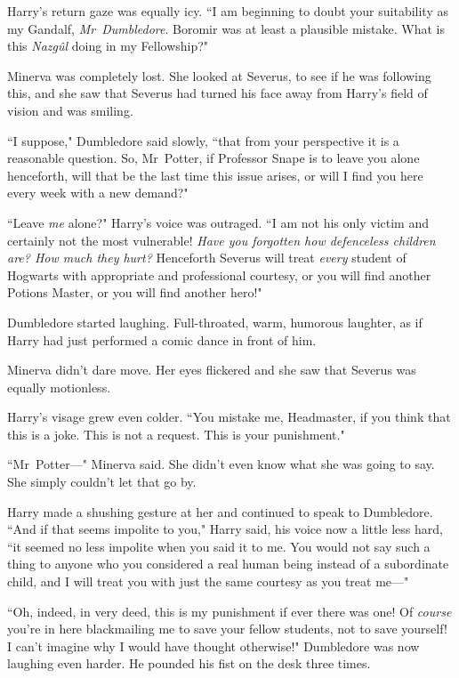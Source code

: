Harry's return gaze was equally icy. ``I am beginning to doubt your suitability as my Gandalf, \emph{Mr~Dumbledore}. Boromir was at least a plausible mistake. What is this \emph{Nazgûl} doing in my Fellowship?"

Minerva was completely lost. She looked at Severus, to see if he was following this, and she saw that Severus had turned his face away from Harry's field of vision and was smiling.

``I suppose," Dumbledore said slowly, ``that from your perspective it is a reasonable question. So, Mr~Potter, if Professor Snape is to leave you alone henceforth, will that be the last time this issue arises, or will I find you here every week with a new demand?"

``Leave \emph{me} alone?" Harry's voice was outraged. ``I am not his only victim and certainly not the most vulnerable! \emph{Have you forgotten how defenceless children are? How much they hurt?} Henceforth Severus will treat \emph{every} student of Hogwarts with appropriate and professional courtesy, or you will find another Potions Master, or you will find another hero!"

Dumbledore started laughing. Full-throated, warm, humorous laughter, as if Harry had just performed a comic dance in front of him.

Minerva didn't dare move. Her eyes flickered and she saw that Severus was equally motionless.

Harry's visage grew even colder. ``You mistake me, Headmaster, if you think that this is a joke. This is not a request. This is your punishment."

``Mr~Potter—" Minerva said. She didn't even know what she was going to say. She simply couldn't let that go by.

Harry made a shushing gesture at her and continued to speak to Dumbledore. ``And if that seems impolite to you," Harry said, his voice now a little less hard, ``it seemed no less impolite when you said it to me. You would not say such a thing to anyone who you considered a real human being instead of a subordinate child, and I will treat you with just the same courtesy as you treat me—"

``Oh, indeed, in very deed, this is my punishment if ever there was one! Of \emph{course} you're in here blackmailing me to save your fellow students, not to save yourself! I can't imagine why I would have thought otherwise!" Dumbledore was now laughing even harder. He pounded his fist on the desk three times.

